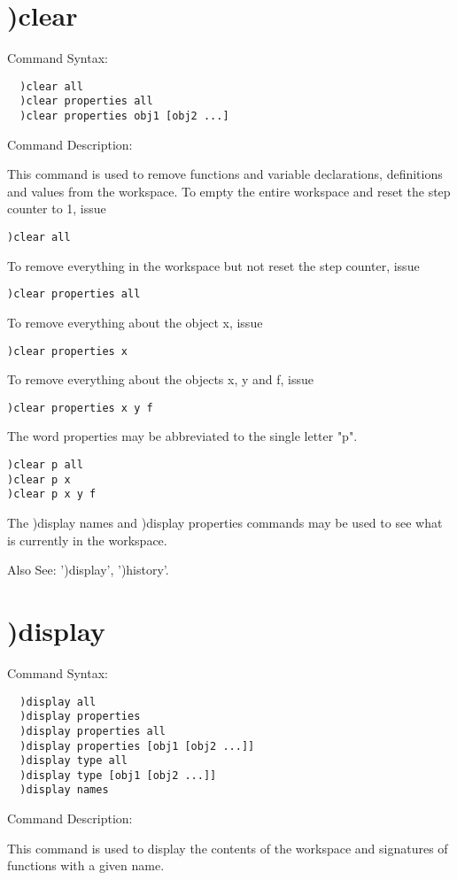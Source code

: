 \section{)clear}

Command Syntax:
\begin{verbatim}
  )clear all
  )clear properties all
  )clear properties obj1 [obj2 ...]
\end{verbatim}
Command Description:

This command is used to remove functions and variable declarations, definitions and values from the workspace. To empty the entire workspace and reset the step counter to 1, issue
\begin{verbatim}
)clear all
\end{verbatim}
To remove everything in the workspace but not reset the step counter, issue

\begin{verbatim}
)clear properties all
\end{verbatim}
To remove everything about the object x, issue
\begin{verbatim}
)clear properties x
\end{verbatim}

To remove everything about the objects x, y and f, issue
\begin{verbatim}
)clear properties x y f
\end{verbatim}
The word properties may be abbreviated to the single letter "p".
\begin{verbatim}
)clear p all
)clear p x
)clear p x y f
\end{verbatim}

The )display names and )display properties commands may be used to see what is currently in the workspace.

Also See: ')display', ')history'.

\section{)display}

Command Syntax:
\begin{verbatim}
  )display all
  )display properties
  )display properties all
  )display properties [obj1 [obj2 ...]]
  )display type all
  )display type [obj1 [obj2 ...]]
  )display names
\end{verbatim}
Command Description:

This command is used to display the contents of the workspace and signatures of functions with a given name.

